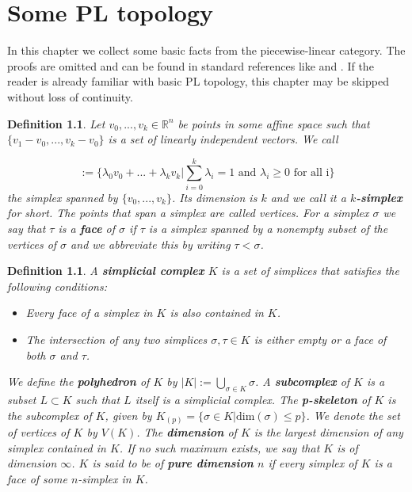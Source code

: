 \documentclass{scrreprt}
\newtheorem{definition}[prop]{Definition}
\begin{document}
\tableofcontents

\chapter{Some PL topology}
\label{sec:Einleitung}

In this chapter we collect some basic facts from the piecewise-linear category. The proofs are omitted and can be found in standard references like \cite{pltopo} and \cite{hatcher}. If the reader is already familiar with basic PL topology, this chapter may be skipped without loss of continuity.

\begin{definition}
Let $v_0,...,v_k \in \mathbb{R}^n$ be points in some affine space such that $\{ v_1-v_0,...,v_k-v_0 \}$ is a set of linearly independent vectors. We call

\begin{equation*}
[v_0,...,v_k] := \Biggl \{  \lambda_0v_0+...+ \lambda_kv_k \Bigg |  \sum_{i=0}^k \lambda_i =1 \text{ and } \lambda_i \geq 0 \text{ for all i} \Biggr \}
\end{equation*}
the simplex spanned by $\{v_0,...,v_k \}$. Its dimension is $k$ and we call it a \textbf{$k$-simplex} for short. The points that span a simplex are called vertices. For a simplex $\sigma$ we say that $\tau$ is a \textbf{face} of $\sigma$ if $\tau$ is a simplex spanned by a nonempty subset of the vertices of $\sigma$ and we abbreviate this by writing $\tau < \sigma$.
\end{definition}

\begin{definition}
A \textbf{simplicial complex} $K$ is a set of simplices that satisfies the following conditions:

\begin{itemize}
\item Every face of a simplex in $K$ is also contained in $K$.
\item The intersection of any two simplices $\sigma, \tau \in K$ is either empty or a face of both $\sigma$ and $\tau$.
\end{itemize}

We define the \textbf{polyhedron} of $K$ by $|K|:= \bigcup_{\sigma \in K} \sigma  $. A \textbf{subcomplex} of $K$ is a subset $L \subset K$ such that $L$ itself is a simplicial complex. The \textbf{p-skeleton} of $K$ is the subcomplex of $K$, given by $K_{(p)}= \{ \sigma \in  K | \text{dim}(\sigma) \leq p \}$. We denote the set of vertices of $K$ by $V(K)$. The \textbf{dimension} of $K$ is the largest dimension of any simplex contained in $K$. If no such maximum exists, we say that $K$ is of dimension $\infty$. $K$ is said to be of \textbf{pure dimension} $n$ if every simplex of $K$ is a face of some $n$-simplex in $K$.
\end{definition}
\end{document}
